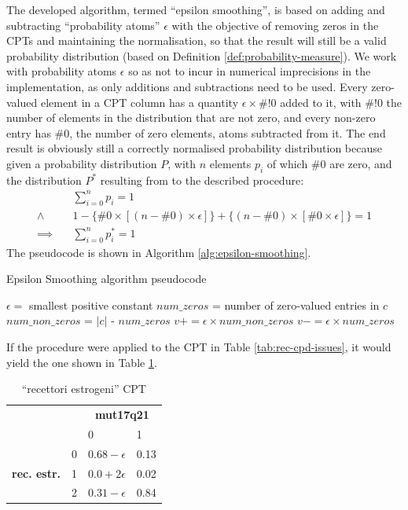 The developed algorithm, termed \enquote{epsilon smoothing}, is based on adding and subtracting \enquote{probability atoms} $\epsilon$ with the objective of removing zeros in the CPTs and maintaining the normalisation, so that the result will still be a valid probability distribution (based on Definition \ref{def:probability-measure}).
We work with probability atoms $\epsilon$ so as not to incur in numerical imprecisions in the implementation, as only additions and subtractions need to be used.
Every zero-valued element in a CPT column has a quantity $\epsilon \times \#!0$ added to it, with $\#!0$ the number of elements in the distribution that are not zero, and every non-zero entry has $\#0$, the number of zero elements, atoms subtracted from it.
The end result is obviously still a correctly normalised probability distribution because given a probability distribution $P$, with $n$ elements $p_i$ of which $\#0$ are zero, and the  distribution $P^*$ resulting from to the described procedure:
\begin{align}
	&\sum\limits_{i=0}^{n} p_i = 1 \\
	\wedge  \quad &1 - \{ \#0 \times [(n - \#0) \times \epsilon] \} + \{ (n - \#0) \times [\#0 \times \epsilon] \}  = 1 \\
	\implies \quad  &\sum\limits_{i=0}^{n} p^*_i = 1
\end{align}
The pseudocode is shown in Algorithm \ref{alg:epsilon-smoothing}.

\begin{algorithm}[htp!]
	\caption{Epsilon Smoothing algorithm pseudocode}
	\label{alg:epsilon-smoothing}
	\begin{algorithmic}[1]
		\State $\epsilon=$ smallest positive constant
			 
				\State $num\_zeros$ = number of zero-valued entries in $c$
				\State $num\_non\_zeros$ = $|c|$ - $num\_zeros$
						\State $v += \epsilon \times num\_non\_zeros$
					\Else
						\State $v -= \epsilon \times num\_zeros$
					\EndIf
				\EndFor
			\EndFor
		\EndFor
	\end{algorithmic}
\end{algorithm}

If the procedure were applied to the CPT in Table \ref{tab:rec-cpd-issues}, it would yield the one shown in Table \ref{tab:rec-cpd-epsilon}.

\begin{table}[htbp]
\centering
\caption{\enquote{recettori estrogeni} CPT}
\begin{tabularx}{0.5\textwidth}{ccXX}
\toprule
      & &  \multicolumn{2}{c}{\textbf{mut17q21}} \\
\cmidrule(lr){3-4}
 & & 0 & 1    \\ 
 \multirow{3}{*}{\textbf{rec. estr.}}  & 0 & $0.68 - \epsilon$ & 0.13  \\
 & 1 & $0.0 + 2\epsilon$ & 0.02    \\
 & 2 & $0.31 - \epsilon$ & 0.84 \\
\bottomrule
\end{tabularx}
\label{tab:rec-cpd-epsilon}
\end{table}


